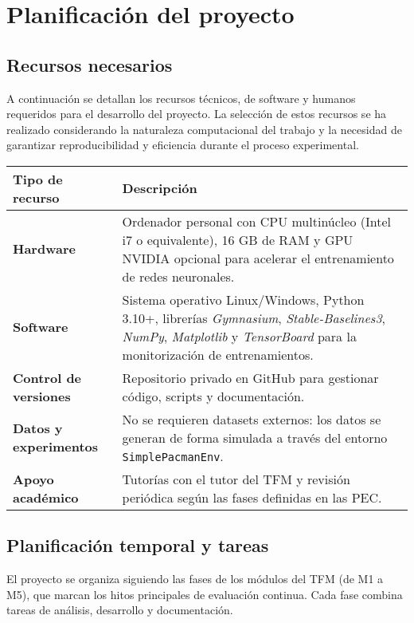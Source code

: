 \chapter{Planificación del proyecto}

\section{Recursos necesarios}

A continuación se detallan los recursos técnicos, de software y humanos requeridos para el desarrollo del proyecto. La selección de estos recursos se ha realizado considerando la naturaleza computacional del trabajo y la necesidad de garantizar reproducibilidad y eficiencia durante el proceso experimental.

\begin{longtable}{>{\bfseries}p{3.5cm} p{10cm}}
Tipo de recurso & Descripción \\ \hline
Hardware & Ordenador personal con CPU multinúcleo (Intel i7 o equivalente), 16 GB de RAM y GPU NVIDIA opcional para acelerar el entrenamiento de redes neuronales. \\
Software & Sistema operativo Linux/Windows, Python 3.10+, librerías \textit{Gymnasium}, \textit{Stable-Baselines3}, \textit{NumPy}, \textit{Matplotlib} y \textit{TensorBoard} para la monitorización de entrenamientos. \\
Control de versiones & Repositorio privado en GitHub para gestionar código, scripts y documentación. \\
Datos y experimentos & No se requieren datasets externos: los datos se generan de forma simulada a través del entorno \texttt{SimplePacmanEnv}. \\
Apoyo académico & Tutorías con el tutor del TFM y revisión periódica según las fases definidas en las PEC. \\
\end{longtable}

\section{Planificación temporal y tareas}

El proyecto se organiza siguiendo las fases de los módulos del TFM (de M1 a M5), que marcan los hitos principales de evaluación continua. Cada fase combina tareas de análisis, desarrollo y documentación.

